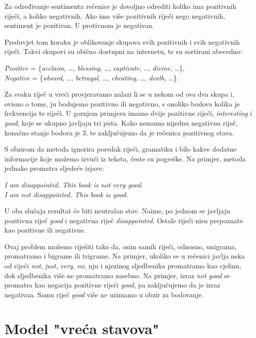 \documentclass[a4paper,twoside,12pt]{memoir} %
\newcommand{\ti}[1]{\textit{#1\/}}
\begin{document}
	Za određivanje sentimenta rečenice je dovoljno odrediti koliko ima pozitivnih riječi, a koliko negativnih. Ako ima više pozitivnih riječi nego negativnih, sentiment je pozitivan. U protivnom je negativan.

	Preduvjet tom koraku je oblikovanje skupova svih pozitivnih i svih negativnih riječi. Takvi skupovi su obično dostupni na internetu, te su sortirani abecedno:
	\begin{displayquote}
		\ti{Positive} = \{\ti{acclaim}, \ldots, \ti{blessing}, \ldots, \ti{captivate}, \ldots, \ti{divine}, \ldots \},\\[3pt]
		\ti{Negative} = \{\ti{absurd}, \ldots, \ti{betrayal}, \ldots, \ti{cheating}, \ldots, \ti{death}, \ldots \}.
	\end{displayquote}

	Za svaku riječ u vreći provjeravamo nalazi li se u nekom od ova dva skupa i, ovisno o tome, ju bodujemo pozitivno ili negativno, s onoliko bodova kolika je frekvencija te riječi. U gornjem primjeru imamo dvije pozitivne riječi, \ti{interesting} i \ti{good}, koje se ukupno javljaju tri puta. Kako nemamo nijednu negativnu riječ, konačno stanje bodova je 3, te zaključujemo da je rečenica pozitivnog stava.

	S obzirom da metoda ignorira poredak riječi, gramatiku i bilo kakve dodatne informacije koje možemo izvući iz teksta, česte su pogreške. Na primjer, metoda jednako promatra sljedeće izjave:
	\begin{displayquote}
		\ti{I am disappointed. This book is not very good.}\\
		\ti{I am not disappointed. This book is good.}
	\end{displayquote}
	U oba slučaja rezultat će biti neutralan stav. Naime, po jednom se javljaju pozitivna riječ \ti{good} i negativna riječ \ti{disappointed}. Ostale riječi nisu prepoznate kao pozitivne ili negativne.

	Ovaj problem možemo riješiti tako da, osim samih riječi, odnosno, unigrama, promatramo i bigrame ili trigrame. Na primjer, ukoliko se u rečenici javlja neka od riječi \ti{not}, \ti{just}, \ti{very}, \ti{no}, nju i njezinog sljedbenika promatramo kao cjelinu, dok sljedbenika više ne promatramo zasebno. Na primjer, izraz \ti{not good} se promatra kao negacija pozitivne riječi \ti{good}, pa zaključujemo da je izraz negativan. Samu riječ \ti{good} više ne uzimamo u obzir za bodovanje.

	\section{Model "vreća stavova"}
\end{document}

